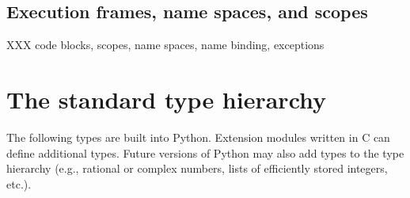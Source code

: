 \section{Execution frames, name spaces, and scopes}

XXX code blocks, scopes, name spaces, name binding, exceptions

\chapter{The standard type hierarchy}

The following types are built into Python.  Extension modules
written in C can define additional types.  Future versions of Python
may also add types to the type hierarchy (e.g., rational or complex
numbers, lists of efficiently stored integers, etc.).

